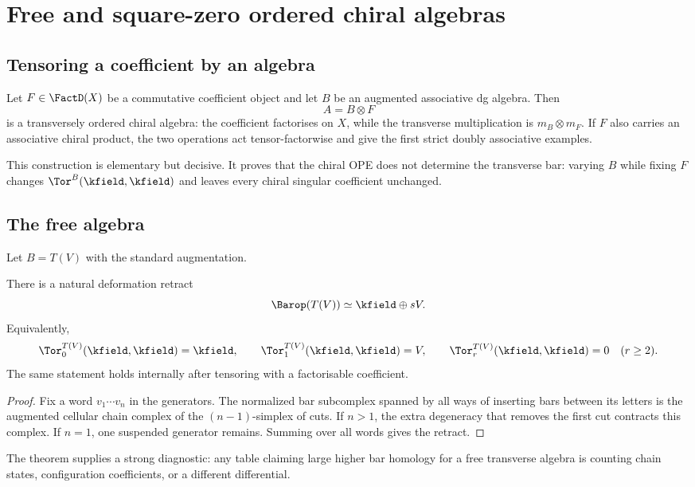 \chapter{Free and square-zero ordered chiral algebras}

\section{Tensoring a coefficient by an algebra}
Let \(F\in\FactD(X)\) be a commutative coefficient object and let \(B\) be an augmented associative dg algebra.  Then
\[
 A=B\otimes F
\]
is a transversely ordered chiral algebra: the coefficient factorises on \(X\), while the transverse multiplication is \(m_B\otimes m_F\).  If \(F\) also carries an associative chiral product, the two operations act tensor-factorwise and give the first strict doubly associative examples.

This construction is elementary but decisive.  It proves that the chiral OPE does not determine the transverse bar: varying \(B\) while fixing \(F\) changes \(\Tor^B(\kfield,\kfield)\) and leaves every chiral singular coefficient unchanged.

\section{The free algebra}
Let \(B=T(V)\) with the standard augmentation.

\begin{theorem}\label{thm:free-bar}
There is a natural deformation retract
\[
 \Barop(T(V))\simeq \kfield\oplus sV.
\]
Equivalently,
\[
 \Tor^{T(V)}_0(\kfield,\kfield)=\kfield,
 \qquad
 \Tor^{T(V)}_1(\kfield,\kfield)=V,
 \qquad
 \Tor^{T(V)}_r(\kfield,\kfield)=0\quad(r\ge2).
\]
The same statement holds internally after tensoring with a factorisable coefficient.
\end{theorem}
\begin{proof}
Fix a word \(v_1\cdots v_n\) in the generators.  The normalized bar subcomplex spanned by all ways of inserting bars between its letters is the augmented cellular chain complex of the \((n-1)\)-simplex of cuts.  If \(n>1\), the extra degeneracy that removes the first cut contracts this complex.  If \(n=1\), one suspended generator remains.  Summing over all words gives the retract.
\end{proof}

The theorem supplies a strong diagnostic: any table claiming large higher bar homology for a free transverse algebra is counting chain states, configuration coefficients, or a different differential.

